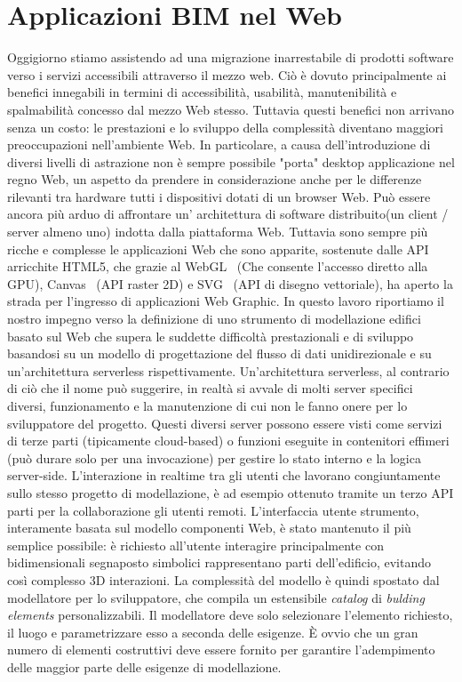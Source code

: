 
\section{Applicazioni BIM nel Web}
\label{sec:chapter_1_section_3}

Oggigiorno stiamo assistendo ad una migrazione inarrestabile di prodotti software verso i servizi accessibili
attraverso il mezzo web. Ciò è dovuto principalmente ai benefici innegabili in termini di accessibilità, usabilità,
manutenibilità e spalmabilità concesso dal mezzo Web stesso.
Tuttavia questi benefici non arrivano senza un costo: le prestazioni e lo sviluppo della complessità diventano
maggiori preoccupazioni nell'ambiente Web.
In particolare, a causa dell'introduzione di diversi livelli di astrazione non è sempre possibile "porta" desktop
applicazione nel regno Web, un aspetto da prendere in considerazione anche per le differenze rilevanti tra hardware
tutti i dispositivi dotati di un browser Web.
Può essere ancora più arduo di affrontare un' architettura di software distribuito(un client / server almeno uno)
indotta dalla piattaforma Web. Tuttavia sono sempre più ricche e complesse le applicazioni Web che sono apparite,
sostenute dalle API arricchite HTML5, che grazie al WebGL~\cite{webgl}
(Che consente l'accesso diretto alla GPU), Canvas~\cite{Munro:15:HCC} (API raster 2D) e SVG~\cite{Jackson:11:SVG}
(API di disegno vettoriale), ha aperto la strada per l'ingresso di applicazioni Web Graphic.
In questo lavoro riportiamo il nostro impegno verso la definizione di uno strumento di modellazione edifici basato sul Web
che supera le suddette difficoltà prestazionali e di sviluppo basandosi su un modello di progettazione del flusso di dati
unidirezionale e su un'architettura serverless rispettivamente.
Un'architettura serverless, al contrario di ciò che il nome può suggerire, in realtà si avvale di molti server specifici
diversi, funzionamento e la manutenzione di cui non le fanno onere per lo sviluppatore del progetto.
Questi diversi server possono essere visti come servizi di terze parti (tipicamente cloud-based) o funzioni eseguite
in contenitori effimeri (può durare solo per una invocazione) per gestire lo stato interno e la logica server-side.
L'interazione in realtime tra gli utenti che lavorano congiuntamente sullo stesso progetto di modellazione,
è ad esempio ottenuto tramite un terzo API parti per la collaborazione gli utenti remoti.
L'interfaccia utente strumento, interamente basata sul modello componenti Web, è stato mantenuto il più semplice possibile: è richiesto all'utente
 interagire principalmente con bidimensionali segnaposto simbolici rappresentano parti dell'edificio, evitando così complesso 3D
  interazioni.
La complessità del modello è quindi spostato dal modellatore per lo sviluppatore, che compila un estensibile \emph{catalog} di
\emph{bulding elements} personalizzabili. Il modellatore deve solo selezionare l'elemento richiesto, il luogo e parametrizzare
esso a seconda delle esigenze. È ovvio che un gran numero di elementi costruttivi deve essere fornito per garantire
l'adempimento delle maggior parte delle esigenze di modellazione.

